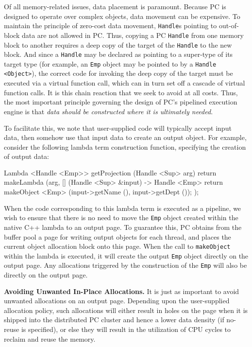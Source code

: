 Of all memory-related issues,  
data placement is paramount.  Because PC is designed to operate over
complex objects, data movement can be 
expensive.  To maintain the principle of
zero-cost data movement, \texttt{Handle}s pointing to out-of-block data are not allowed in PC.
Thus, copying a PC \texttt{Handle} from one memory block to another requires a deep copy of the target of the \texttt{Handle} to the new block.  
And since a
\texttt{Handle} may be declared as pointing to a super-type of its
target type (for example, an \texttt{Emp} object may be pointed to by a \texttt{Handle <Object>}), the correct code for invoking the deep copy of the
target must be executed via a virtual 
function call, which can in turn set off a cascade of virtual function calls. It is this chain reaction that we seek to avoid at all costs.
Thus, the most important principle governing the 
design of PC's pipelined execution engine is that \emph{data should be constructed where it is ultimately needed}.

To facilitate this, we note that user-supplied code will typically accept input data, then somehow use that input data to
create an output object.  For example, consider 
the following lambda term construction function, specifying the creation of output data:

\begin{codesmall}
Lambda <Handle <Emp>> getProjection (Handle <Sup> arg) {
        return makeLambda (arg, [] (Handle <Sup> &input) -> Handle <Emp> {
		return makeObject <Emp> (input->getName (), input->getDept ());
	});}
\end{codesmall}

\noindent
When the code corresponding to this lambda term is executed as a pipeline,
we wish to ensure that there is no need to move the \texttt{Emp} object created within the native C++ lambda to an output page.
To guarantee this,
PC obtains from the buffer pool a page for writing output objects for each thread, and places the current object allocation block
onto this page. 
When the call to \texttt{makeObject} within the lambda is executed, it will create the output \texttt{Emp} object
directly on the output page.  Any allocations triggered by the construction of the \texttt{Emp} will also be directly on the output page.

\vspace{5 pt}
\noindent
\textbf{Avoiding Unwanted In-Place Allocations.}
It is just as important to avoid unwanted allocations on an output page.  Depending upon the user-supplied
allocation policy, such allocations will either result
in holes on the page when it is shipped into the distributed PC cluster and hence a lower data density (if no-reuse is specified), 
or else they will result in the utilization of CPU cycles to 
reclaim and reuse the memory. 

